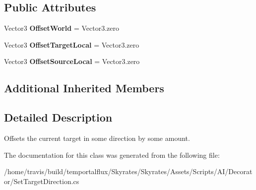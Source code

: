 \subsection*{Public Attributes}
\begin{DoxyCompactItemize}
\item 
\hypertarget{class_skyrates_1_1_a_i_1_1_decorator_1_1_set_target_direction_acdeb059a92ef9caf4c7c2d67930d053c}{Vector3 {\bfseries Offset\-World} = Vector3.\-zero}\label{class_skyrates_1_1_a_i_1_1_decorator_1_1_set_target_direction_acdeb059a92ef9caf4c7c2d67930d053c}

\item 
\hypertarget{class_skyrates_1_1_a_i_1_1_decorator_1_1_set_target_direction_ab58f2b6430304ffaacc3bb401d8dfe1e}{Vector3 {\bfseries Offset\-Target\-Local} = Vector3.\-zero}\label{class_skyrates_1_1_a_i_1_1_decorator_1_1_set_target_direction_ab58f2b6430304ffaacc3bb401d8dfe1e}

\item 
\hypertarget{class_skyrates_1_1_a_i_1_1_decorator_1_1_set_target_direction_a98be99c424902e537530e6ab10a01180}{Vector3 {\bfseries Offset\-Source\-Local} = Vector3.\-zero}\label{class_skyrates_1_1_a_i_1_1_decorator_1_1_set_target_direction_a98be99c424902e537530e6ab10a01180}

\end{DoxyCompactItemize}
\subsection*{Additional Inherited Members}


\subsection{Detailed Description}
Offsets the current target in some direction by some amount. 



The documentation for this class was generated from the following file\-:\begin{DoxyCompactItemize}
\item 
/home/travis/build/temportalflux/\-Skyrates/\-Skyrates/\-Assets/\-Scripts/\-A\-I/\-Decorator/Set\-Target\-Direction.\-cs\end{DoxyCompactItemize}
